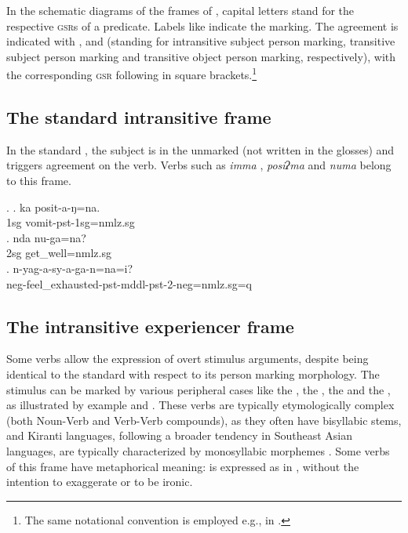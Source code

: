 In the schematic diagrams of the frames of ,  capital letters stand for the respective \textsc{gsr}s of a predicate. Labels like  indicate the  marking. The agreement is indicated with ,  and  (standing for intransitive subject person marking, transitive subject person marking and transitive object person marking, respectively), with the corresponding \textsc{gsr} following in square brackets.\footnote{The same notational convention is employed  e.g., in \citet{Schikowski2014_Flexible}.} 
 
\subsection{The standard intransitive frame}\label{stand-itr}


\noindent 
In the standard , the subject is in the unmarked   (not written in the glosses) and triggers agreement on the verb. Verbs such as \emph{imma} ,  \emph{posiʔma}  and \emph{numa}  belong to this frame.

\ex. \ag. ka posit-a-ŋ=na.\\
		 {\sc 1sg} vomit-{\sc pst-1sg=nmlz.sg}	\\
 	\bg. nda nu-ga=na?\\
	{\sc 2sg}  get\_well{=nmlz.sg}	\\
	\bg. n-yag-a-sy-a-ga-n=na=i?\\ 
{\sc neg}-feel\_exhausted{\sc -pst-mddl-pst-2-neg=nmlz.sg=q}\\

\subsection{The intransitive experiencer frame}\label{itr-exp}


\noindent 
Some  verbs allow the expression of overt stimulus arguments, despite being identical to  the standard  with respect to its person marking morphology. The stimulus can be marked by various peripheral cases like the , the , the  and the , as illustrated by example \Next[a] and \Next[b].  These  verbs are typically etymologically complex (both Noun-Verb and Verb-Verb compounds), as they often have bisyllabic stems, and Kiranti languages, following a broader tendency in Southeast Asian languages, are typically characterized by monosyllabic morphemes \citep{Matisoff1990_Bulging}. Some verbs of this frame have metaphorical meaning:  is expressed as in \Next[c], without the intention to exaggerate or to be ironic. 

